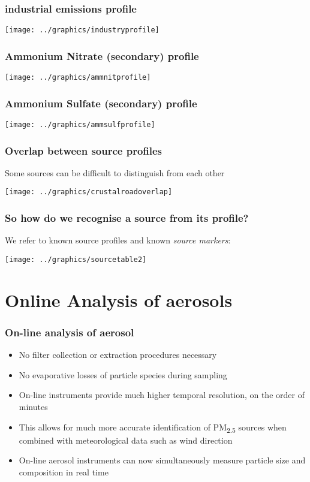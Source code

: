 ﻿\documentclass[ignorenonframetext]{beamer}
\begin{document}
\begin{frame}
\frametitle{industrial emissions profile}
\texttt{[image: ../graphics/industryprofile]}
\end{frame}

\begin{frame}
\frametitle{Ammonium Nitrate (secondary) profile}
\texttt{[image: ../graphics/ammnitprofile]}
\end{frame}

\begin{frame}
\frametitle{Ammonium Sulfate (secondary) profile}
\texttt{[image: ../graphics/ammsulfprofile]}
\end{frame}

\begin{frame}
\frametitle{Overlap between source profiles}
Some sources can be difficult to distinguish from each other

\texttt{[image: ../graphics/crustalroadoverlap]}
\end{frame}

\begin{frame}
\frametitle{So how do we recognise a source from its profile?}
We refer to known source profiles and known \textit{source markers}:

\centering \texttt{[image: ../graphics/sourcetable2]}
\end{frame}

\section{Online Analysis of aerosols}

\begin{frame}
\frametitle{On-line analysis of aerosol}
\begin{itemize}
\item No filter collection or extraction procedures necessary
\item No evaporative losses of particle species during sampling
\item On-line instruments provide much higher temporal resolution, on
the order of minutes
\item This allows for much more accurate identification of PM\textsubscript{2.5} sources
when combined with meteorological data such as wind direction
\item On-line aerosol instruments can now simultaneously measure
particle size and composition in real time
\end{itemize}
\end{frame}
\end{document}
